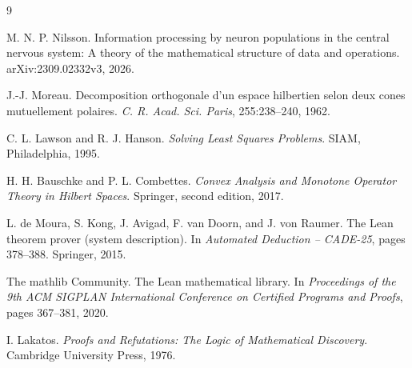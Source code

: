 \documentclass[11pt,a4paper]{article}
\begin{document}
\clearpage
\begin{thebibliography}{9}

M. N. P. Nilsson.
\newblock Information processing by neuron populations in the central nervous
system: A theory of the mathematical structure of data and operations.
\newblock arXiv:2309.02332v3, 2026.

J.-J. Moreau.
\newblock Decomposition orthogonale d'un espace hilbertien selon deux cones
mutuellement polaires.
\newblock \emph{C. R. Acad. Sci. Paris}, 255:238--240, 1962.

C. L. Lawson and R. J. Hanson.
\newblock \emph{Solving Least Squares Problems}.
\newblock SIAM, Philadelphia, 1995.

H. H. Bauschke and P. L. Combettes.
\newblock \emph{Convex Analysis and Monotone Operator Theory in Hilbert Spaces}.
\newblock Springer, second edition, 2017.

L. de Moura, S. Kong, J. Avigad, F. van Doorn, and J. von Raumer.
\newblock The Lean theorem prover (system description).
\newblock In \emph{Automated Deduction -- CADE-25}, pages 378--388.
Springer, 2015.

The mathlib Community.
\newblock The Lean mathematical library.
\newblock In \emph{Proceedings of the 9th ACM SIGPLAN International Conference on
Certified Programs and Proofs}, pages 367--381, 2020.

I. Lakatos.
\newblock \emph{Proofs and Refutations: The Logic of Mathematical Discovery}.
\newblock Cambridge University Press, 1976.

\end{thebibliography}
\end{document}
